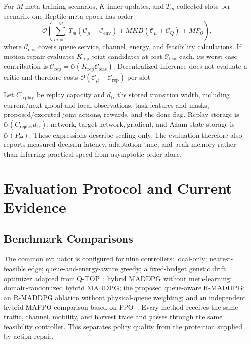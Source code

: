 \documentclass[journal]{IEEEtran}
\begin{document}
For $M$ meta-training scenarios, $K$ inner updates, and $T_m$ collected slots
per scenario, one Reptile meta-epoch has order
\begin{equation}
\mathcal O\!\left(
\sum_{m=1}^{M}T_m(\mathcal C_{\mu}+\mathcal C_{\mathrm{env}})
+MKB(\mathcal C_{\mu}+\mathcal C_Q)+MP_{\Theta}\right),
\label{eq:meta_complexity}
\end{equation}
where $\mathcal C_{\mathrm{env}}$ covers queue service, channel, energy, and
feasibility calculations.  If motion repair evaluates $K_{\mathrm{rep}}$
joint candidates at cost $\mathcal C_{\mathrm{feas}}$ each, its worst-case
contribution is
$\mathcal C_{\mathrm{rep}}=\mathcal O(K_{\mathrm{rep}}
\mathcal C_{\mathrm{feas}})$.  Decentralized inference does not evaluate a
critic and therefore costs
$\mathcal O(\mathcal C_{\mu}+\mathcal C_{\mathrm{rep}})$ per slot.

Let $C_{\mathrm{replay}}$ be replay capacity and $d_{\mathrm{tr}}$ the stored
transition width, including current/next global and local observations, task
features and masks, proposed/executed joint actions, rewards, and the done
flag.  Replay storage is $\mathcal O(C_{\mathrm{replay}}d_{\mathrm{tr}})$;
network, target-network, gradient, and Adam state storage is
$\mathcal O(P_{\Theta})$.  These expressions describe scaling only.  The
evaluation therefore also reports measured decision latency, adaptation time,
and peak memory rather than inferring practical speed from asymptotic order
alone.

\section{Evaluation Protocol and Current Evidence}
\label{results}

\subsection{Benchmark Comparisons}
The common evaluator is configured for nine controllers: local-only;
nearest-feasible edge; queue-and-energy-aware greedy; a fixed-budget genetic
drift optimizer adapted from Q-TOP~\cite{sun2026qtop}; hybrid MADDPG without
meta-learning; domain-randomized hybrid MADDPG; the proposed queue-aware
R-MADDPG; an R-MADDPG ablation without physical-queue weighting; and an
independent hybrid MAPPO comparison based on PPO~\cite{schulman2017proximal}.
Every method receives the same traffic, channel, mobility, and harvest trace
and passes through the same feasibility controller.  This separates policy
quality from the protection supplied by action repair.
\end{document}
